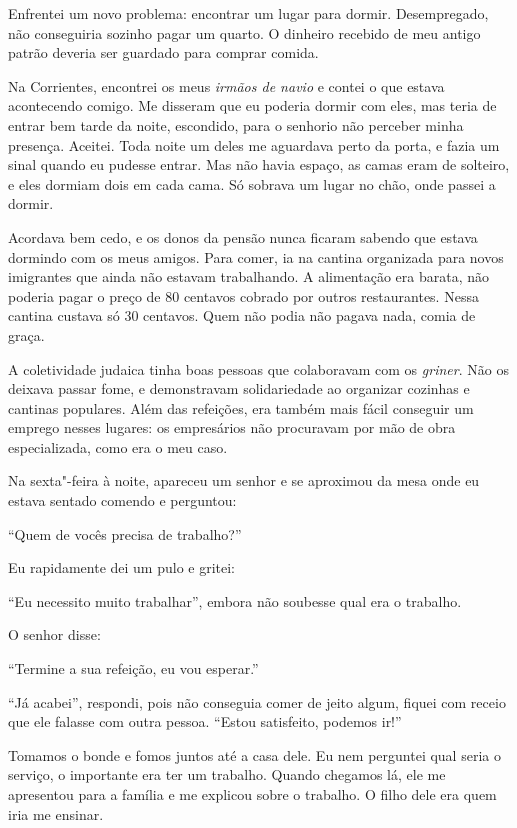 Enfrentei um novo problema: encontrar um lugar para dormir. 
Desempregado, não conseguiria sozinho pagar um quarto. O dinheiro recebido de meu antigo 
patrão deveria ser guardado para comprar comida.

Na Corrientes, encontrei os meus \textit{irmãos de navio} e contei o 
que estava acontecendo comigo.
Me disseram que eu poderia dormir com eles, mas teria de
entrar bem tarde da noite, escondido, para o senhorio não perceber 
minha presença. Aceitei. Toda noite um deles me aguardava perto da porta, 
e fazia um sinal quando eu pudesse entrar. Mas não havia espaço, as camas
eram de solteiro, e eles dormiam dois em cada cama. Só sobrava um lugar
no chão, onde passei a dormir.

Acordava bem cedo, e os donos da pensão nunca ficaram sabendo que estava
dormindo com os meus amigos. Para comer, ia na cantina organizada 
para novos imigrantes que ainda não estavam trabalhando. A alimentação 
era barata, não poderia pagar o preço de
80 centavos cobrado por outros restaurantes. Nessa cantina custava só 30
centavos. Quem não podia não pagava nada, comia de graça.

A coletividade judaica tinha boas pessoas que colaboravam com os
\textit{griner}. Não os deixava passar fome, e demonstravam solidariedade 
ao organizar cozinhas e cantinas populares. Além das refeições, era também mais
fácil conseguir um emprego nesses lugares: os empresários
não procuravam por mão de obra especializada, como era o meu caso.

Na sexta"-feira à noite, apareceu um senhor e se aproximou da mesa onde
eu estava sentado comendo e perguntou:

``Quem de vocês precisa de trabalho?''

Eu rapidamente dei um pulo e gritei:

``Eu necessito muito trabalhar'', embora não soubesse qual era o
trabalho.

O senhor disse:

``Termine a sua refeição, eu vou esperar.''

``Já acabei'', respondi, pois não conseguia comer de jeito algum, fiquei
com receio que ele falasse com outra pessoa. ``Estou satisfeito, podemos
ir!''

Tomamos o bonde e fomos juntos até a casa dele. Eu nem perguntei qual
seria o serviço, o importante era ter um trabalho. Quando
chegamos lá, ele me apresentou para a família e me explicou sobre o
trabalho. O filho dele era quem iria me ensinar.


